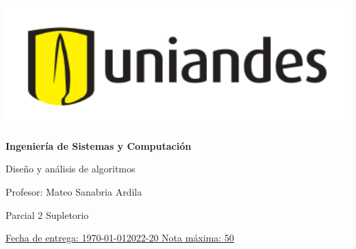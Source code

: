 \documentclass[12pt, a4paper]{exam}
\begin{document}
	\noindent
	\begin{minipage}[l]{0.1\textwidth}
		\noindent
		\includegraphics[width=1.8\textwidth]{Logosimbolo-uniandes_horizontal.png}
	\end{minipage}
\hfill
\begin{minipage}[c]{0.8\textwidth}
	\begin{center}
		{\large \textbf{Ingeniería de Sistemas y Computación} \par
		\large	Diseño y análisis de algoritmos	\par
		\small  Profesor: Mateo Sanabria Ardila	\par
		\small  Parcial 2 Supletorio	\par
		}
	\end{center}
\end{minipage}
\par
\vspace{0.2in}
\noindent
\uline{Fecha de entrega: \today 	\hfill  2022-20		\hfill Nota máxima: 50}
\par 
\vspace{0.15in}
\end{document}
